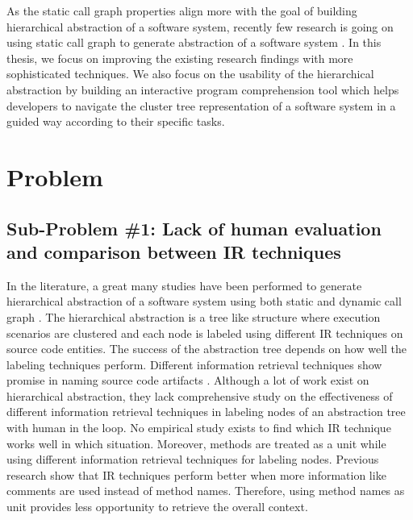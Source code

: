 As the static call graph properties align more with the goal of building hierarchical abstraction of a software system, recently few research is going on using static call graph to generate abstraction of a software system \cite{gharibi2018automaticStaticCluster, walunj2019graphevoEvolutionCall}. In this thesis, we focus on improving the existing research findings with more sophisticated techniques. We also focus on the usability of the hierarchical abstraction by building an interactive program comprehension tool which helps developers to navigate the cluster tree representation of a software system
in a guided way according to their specific tasks. 

 
\newpage


\section{Problem }
\label{intro:problem}
    \subsection{Sub-Problem \#1: Lack of human evaluation and comparison between IR techniques} In the literature, a great many studies have been performed to generate hierarchical abstraction of a software system using both static and dynamic call graph \cite{feng2018hierarchicalExecutionComprehension, gharibi2018automaticStaticCluster, xin2019identifyingFeaturesExecution}. The hierarchical abstraction is a tree like structure where execution scenarios are clustered and each node is labeled using different IR techniques on source code entities. The success of the abstraction tree depends on how well the labeling techniques perform. Different information retrieval techniques show promise in naming source code artifacts \cite{chen2016topicMiningRepositories, panichella2013topicModelsTasks, sun2016surveyTopicSE}. Although a lot of work exist on hierarchical abstraction, they lack comprehensive study on the effectiveness of different information retrieval techniques in labeling nodes of an abstraction tree with human in the loop. No empirical study exists to find which IR technique works well in which situation. Moreover, methods are treated as a unit \cite{gharibi2018automaticStaticCluster, feng2018hierarchicalExecutionComprehension} while using different information retrieval techniques for labeling nodes. Previous research \cite{de2012IRMethodsArtifacts} show that IR techniques perform better when more information like comments are used instead of method names. Therefore, using method names as unit provides less opportunity to retrieve the overall context.
    

